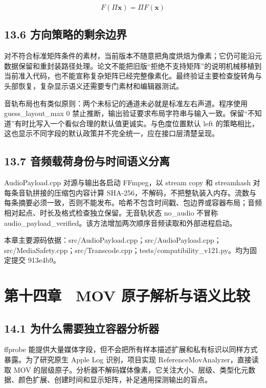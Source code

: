 \documentclass[UTF8,zihao=-4,openany]{ctexbook}
\begin{document}
\begin{equation}
F(\Pi\mathbf{x})=\Pi F(\mathbf{x})
\end{equation}

\section*{13.6 方向策略的剩余边界}
对不符合标准矩阵条件的素材，当前版本不随意把角度烘焙为像素；它仍可能沿元数据保留和重封装路径处理。论文不能把旧版“拒绝不支持矩阵”的说明机械移植到当前准入代码，也不能宣称复杂矩阵已经完整像素化。最终验证主要检查旋转角与头部恢复，复杂显示语义还需要专门素材和编辑器测试。

音轨布局也有类似原则：两个未标记的通道未必就是标准左右声道。程序使用 guess\_layout\_max 0 禁止推断，输出验证要求布局字符串与输入一致。保留“不知道”有时比写入一个看似合理的默认值更诚实。与色度位置默认 left 的策略相比，这也显示不同字段的默认政策并不完全统一，应在接口层清楚呈现。


\section*{13.7 音频载荷身份与时间语义分离}
AudioPayload.cpp 对源与输出各启动 FFmpeg，以 stream copy 和 streamhash 对每条音轨拼接的压缩包内容计算 SHA-256，不解码，不把整轨装入内存。流数与每条摘要必须一致，否则不能发布。哈希不包含时间戳、包边界或容器布局；音频相对起点、时长及格式检查独立保留。无音轨状态 no\_audio 不冒称 audio\_payload\_verified。该方法增加两次顺序音频读取和外部进程启动。


\par\small 本章主要源码依据：src/AudioPayload.cpp；src/AudioPayload.cpp；src/MediaSafety.cpp；src/Transcode.cpp；tests/compatibility\_v121.py。均为固定提交 913e4b9。\normalsize

\chapter*{第十四章　MOV 原子解析与语义比较}

\section*{14.1 为什么需要独立容器分析器}
ffprobe 能提供大量媒体字段，但不会把所有样本描述扩展和私有标识以同样方式暴露。为了研究原生 Apple Log 识别，项目实现 ReferenceMovAnalyzer，直接读取 MOV 的层级原子。分析器不解码媒体像素，它关注大小、层级、类型化元数据、颜色扩展、创建时间和显示矩阵，补足通用探测输出的盲点。
\end{document}
